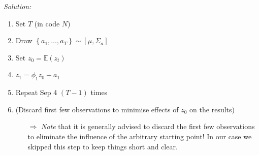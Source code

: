\documentclass[12pt,a4paper]{article}
\begin{document}
\emph{Solution:}\\

\begin{enumerate}
  \item Set $T$ (in code $N$)
  \item Draw $\left\{ a_1, \ldots , a_T \right\} \sim \left[ \mu , \Sigma_a \right]$
  \item Set $z_0 = \mathbb{E} \left( z_t\right)$
  \item $z_1 = \phi_1 z_0 + a_1$
  \item Repeat Sep 4 $(T - 1)$ times
  \item (Discard first few observations to minimise effects of $z_0$ on the results)
  \begin{itemize}
    \item[$\Rightarrow$] \textit{Note} that it is generally advised to discard the first few observations to eliminate the influence of the arbitrary starting point! In our case we skipped this step to keep things short and clear.
  \end{itemize}
\end{enumerate}
\end{document}
